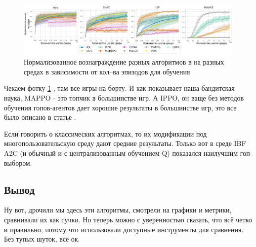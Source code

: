 \begin{figure}[H]
	\begin{center}
		\includegraphics[pages=-, width=140mm]{./inc/img/comp_big.png}
		\caption{Нормализованное вознаграждение разных алгоритмов в на разных средах в зависимости от кол--ва эпизодов для обучения}
		\label{fig:mappo_perf}
	\end{center}
\end{figure}
Чекаем фотку \ref{fig:mappo_perf} \cite{DBLP:journals/corr/abs-2103-01955}, там все игры на борту. И как показывает наша бандитская наука, MAPPO - это топчик в большинстве игр. А IPPO, он ваще без методов обучения гопов-агентов дает хорошие результаты в большинстве игр, это все было описано в статье \cite{DBLP:journals/corr/abs-2103-01955}.

Если говорить о классических алгоритмах, то их модификации под многопользовательскую среду дают средние результаты. Только вот в среде IBF A2C (и обычный и с централизованным обучением Q) показался наилучшим гоп-выбором.
\subsection*{Вывод}
Ну вот, дрочили мы здесь эти алгоритмы, смотрели на графики и метрики, сравнивали их как сучки. Но теперь можно с уверенностью сказать, что всё четко и правильно, потому что использовали доступные инструменты для сравнения. Без тупых шуток, всё ок.
